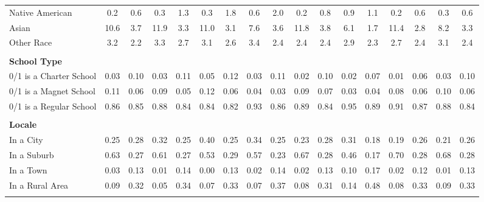 \begin{tabular*}{\linewidth}{@{\extracolsep{\fill} } lcccccccccccccccc}
\hspace{0.2cm}Native American&0.2&0.6&0.3&1.3&0.3&1.8&0.6&2.0&0.2&0.8&0.9&1.1&0.2&0.6&0.3&0.6\\%
\hspace{0.2cm}Asian&10.6&3.7&11.9&3.3&11.0&3.1&7.6&3.6&11.8&3.8&6.1&1.7&11.4&2.8&8.2&3.3\\%
\hspace{0.2cm}Other Race&3.2&2.2&3.3&2.7&3.1&2.6&3.4&2.4&2.4&2.4&2.9&2.3&2.7&2.4&3.1&2.4\\%
&&&&&&&&&&&&&&&&\\%
\multicolumn{17}{l}{\bfseries School Type}\\%
\hspace{0.2cm}0/1 is a Charter School&0.03&0.10&0.03&0.11&0.05&0.12&0.03&0.11&0.02&0.10&0.02&0.07&0.01&0.06&0.03&0.10\\%
\hspace{0.2cm}0/1 is a Magnet School&0.11&0.06&0.09&0.05&0.12&0.06&0.04&0.03&0.09&0.07&0.03&0.04&0.08&0.06&0.10&0.06\\%
\hspace{0.2cm}0/1 is a Regular School&0.86&0.85&0.88&0.84&0.84&0.82&0.93&0.86&0.89&0.84&0.95&0.89&0.91&0.87&0.88&0.84\\%
&&&&&&&&&&&&&&&&\\%
\multicolumn{17}{l}{\bfseries Locale}\\%
\hspace{0.2cm}In a City&0.25&0.28&0.32&0.25&0.40&0.25&0.34&0.25&0.23&0.28&0.31&0.18&0.19&0.26&0.21&0.26\\%
\hspace{0.2cm}In a Suburb&0.63&0.27&0.61&0.27&0.53&0.29&0.57&0.23&0.67&0.28&0.46&0.17&0.70&0.28&0.68&0.28\\%
\hspace{0.2cm}In a Town&0.03&0.13&0.01&0.14&0.00&0.13&0.02&0.14&0.02&0.13&0.10&0.17&0.02&0.12&0.01&0.13\\%
\hspace{0.2cm}In a Rural Area&0.09&0.32&0.05&0.34&0.07&0.33&0.07&0.37&0.08&0.31&0.14&0.48&0.08&0.33&0.09&0.33\\%
&&&&&&&&&&&&&&&&\\%
\hline%
\end{tabular*}